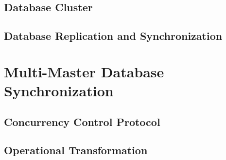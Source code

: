 \subsection{Database Cluster}

\subsection{Database Replication and Synchronization}

\section{Multi-Master Database Synchronization}

\subsection{Concurrency Control Protocol}

\subsection{Operational Transformation}
